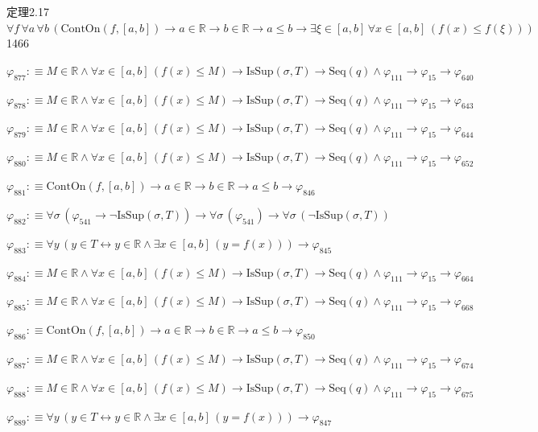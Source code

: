 \begin{fullproof}{定理2.17}{$\forall f\,\forall a\,\forall b\,(\mathrm{ContOn}(f,[a,b]) \to a \in \mathbb{R} \to b \in \mathbb{R} \to a \leq b \to \exists \xi \in [a,b]\,\forall x \in [a,b]\,(f(x) \leq f(\xi)))$}{1466}
\begin{abbrevlist}
\item $\varphi_{877} :\equiv M \in \mathbb{R} \land \forall x \in [a,b]\,(f(x) \leq M) \to \mathrm{IsSup}(\sigma,T) \to \mathrm{Seq}(q) \land \varphi_{111} \to \varphi_{15} \to \varphi_{640}$
\item $\varphi_{878} :\equiv M \in \mathbb{R} \land \forall x \in [a,b]\,(f(x) \leq M) \to \mathrm{IsSup}(\sigma,T) \to \mathrm{Seq}(q) \land \varphi_{111} \to \varphi_{15} \to \varphi_{643}$
\item $\varphi_{879} :\equiv M \in \mathbb{R} \land \forall x \in [a,b]\,(f(x) \leq M) \to \mathrm{IsSup}(\sigma,T) \to \mathrm{Seq}(q) \land \varphi_{111} \to \varphi_{15} \to \varphi_{644}$
\item $\varphi_{880} :\equiv M \in \mathbb{R} \land \forall x \in [a,b]\,(f(x) \leq M) \to \mathrm{IsSup}(\sigma,T) \to \mathrm{Seq}(q) \land \varphi_{111} \to \varphi_{15} \to \varphi_{652}$
\item $\varphi_{881} :\equiv \mathrm{ContOn}(f,[a,b]) \to a \in \mathbb{R} \to b \in \mathbb{R} \to a \leq b \to \varphi_{846}$
\item $\varphi_{882} :\equiv \forall \sigma\,(\varphi_{541} \to \neg \mathrm{IsSup}(\sigma,T)) \to \forall \sigma\,(\varphi_{541}) \to \forall \sigma\,(\neg \mathrm{IsSup}(\sigma,T))$
\item $\varphi_{883} :\equiv \forall y\,(y \in T \leftrightarrow y \in \mathbb{R} \land \exists x \in [a,b]\,(y = f(x))) \to \varphi_{845}$
\item $\varphi_{884} :\equiv M \in \mathbb{R} \land \forall x \in [a,b]\,(f(x) \leq M) \to \mathrm{IsSup}(\sigma,T) \to \mathrm{Seq}(q) \land \varphi_{111} \to \varphi_{15} \to \varphi_{664}$
\item $\varphi_{885} :\equiv M \in \mathbb{R} \land \forall x \in [a,b]\,(f(x) \leq M) \to \mathrm{IsSup}(\sigma,T) \to \mathrm{Seq}(q) \land \varphi_{111} \to \varphi_{15} \to \varphi_{668}$
\item $\varphi_{886} :\equiv \mathrm{ContOn}(f,[a,b]) \to a \in \mathbb{R} \to b \in \mathbb{R} \to a \leq b \to \varphi_{850}$
\item $\varphi_{887} :\equiv M \in \mathbb{R} \land \forall x \in [a,b]\,(f(x) \leq M) \to \mathrm{IsSup}(\sigma,T) \to \mathrm{Seq}(q) \land \varphi_{111} \to \varphi_{15} \to \varphi_{674}$
\item $\varphi_{888} :\equiv M \in \mathbb{R} \land \forall x \in [a,b]\,(f(x) \leq M) \to \mathrm{IsSup}(\sigma,T) \to \mathrm{Seq}(q) \land \varphi_{111} \to \varphi_{15} \to \varphi_{675}$
\item $\varphi_{889} :\equiv \forall y\,(y \in T \leftrightarrow y \in \mathbb{R} \land \exists x \in [a,b]\,(y = f(x))) \to \varphi_{847}$

\end{abbrevlist}
\end{fullproof}
